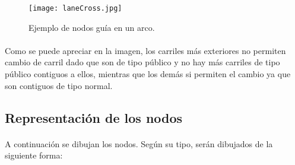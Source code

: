 	\begin{figure}[H]
		\centering
			\texttt{[image: laneCross.jpg]}
	\caption{Ejemplo de nodos guía en un arco.}
	\label{fig:laneCross}
	\end{figure}
	
	\paragraph{}
	Como se puede apreciar en la imagen, los carriles más exteriores no permiten cambio de carril dado que son de tipo público y no hay más carriles de tipo público contiguos a ellos, mientras que los demás si permiten el cambio ya que son contiguos de tipo normal.
	
	\subsection{Representación de los nodos}
	\paragraph{}
	A continuación se dibujan los nodos. Según su tipo, serán dibujados de la siguiente forma:
	
